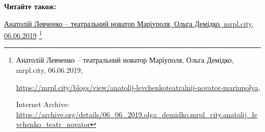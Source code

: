  
 
 
 
 

\def\pubIA{https://archive.org/details/06_06_2019.olga_demidko.mrpl_city.anatolij_levchenko_teatr_novator}
\def\pubTitle{Анатолій Левченко – театральний новатор Маріуполя}
\def\pubDate{06.06.2019}
\def\pubOrigin{https://mrpl.city/blogs/view/anatolij-levchenkoteatralnij-novator-mariupolya}
\def\pubAuthor{Ольга Демідко}

\textbf{Читайте також:}\par\href{\pubIA}{%
\pubTitle, \pubAuthor, mrpl.city, \pubDate}%
\footnote{\pubTitle, \pubAuthor, mrpl.city, \pubDate, \par\url{\pubOrigin}, \par Internet Archive: \url{\pubIA}}
